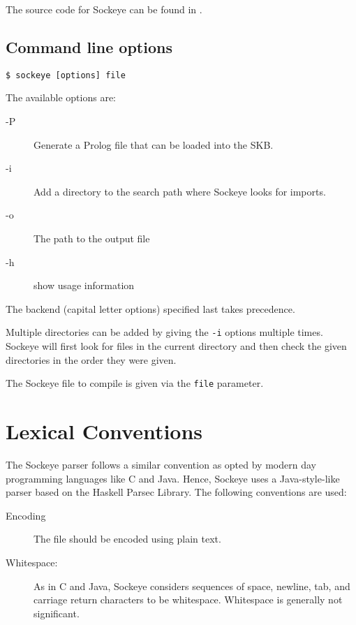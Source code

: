 \documentclass[a4paper,11pt,twoside]{report}
\begin{document}
{{{The source code for Sockeye can be found in .


\section{Command line options}

\begin{verbatim}
$ sockeye [options] file
\end{verbatim}


The available options are:
\begin{description}
\item[-P] Generate a Prolog file that can be loaded into the SKB.
\item[-i] Add a directory to the search path where Sockeye looks for imports.
\item[-o]  The path to the output file
\item[-h] show usage information
\end{description}

The backend (capital letter options) specified last takes precedence.

Multiple directories can be added by giving the \texttt{-i} options multiple times.
Sockeye will first look for files in the current directory and then check the given directories in the order they were given.

The Sockeye file to compile is given via the \texttt{file} parameter.


\chapter{Lexical Conventions}
\label{chap:lexer}

The Sockeye parser follows a similar convention as opted by modern day 
programming languages like C and Java. Hence, Sockeye uses a Java-style-like
parser based on the Haskell Parsec Library. The following conventions are used:

\begin{description}
\item[Encoding] The file should be encoded using plain text.
\item[Whitespace:]  As in C and Java, Sockeye considers sequences of
  space, newline, tab, and carriage return characters to be
  whitespace.  Whitespace is generally not significant. 


\end{description}}}}
\end{document}
